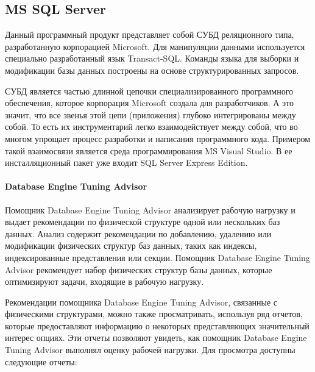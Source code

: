 \subsection{MS SQL Server}

Данный программный продукт представляет собой СУБД реляционного типа, разработанную корпорацией Microsoft. Для манипуляции данными используется специально разработанный язык Transact-SQL. Команды языка для выборки и модификации базы данных построены на основе структурированных запросов.

СУБД является частью длинной цепочки специализированного программного обеспечения, которое корпорация Microsoft создала для разработчиков. А это значит, что все звенья этой цепи (приложения) глубоко интегрированы между собой. То есть их инструментарий легко взаимодействует между собой, что во многом упрощает процесс разработки и написания программного кода. Примером такой взаимосвязи является среда программирования MS Visual Studio. В ее инсталляционный пакет уже входит SQL Server Express Edition. \cite{internet-technologies.ru:SQL-Server}


\paragraph{Database Engine Tuning Advisor}

Помощник Database Engine Tuning Advisor анализирует рабочую нагрузку и выдает рекомендации по физической структуре одной или нескольких баз данных. Анализ содержит рекомендации по добавлению, удалению или модификации физических структур баз данных, таких как индексы, индексированные представления или секции. Помощник Database Engine Tuning Advisor рекомендует набор физических структур базы данных, которые оптимизируют задачи, входящие в рабочую нагрузку.

Рекомендации помощника Database Engine Tuning Advisor, связанные с физическими структурами, можно также просматривать, используя ряд отчетов, которые предоставляют информацию о некоторых представляющих значительный интерес опциях. Эти отчеты позволяют увидеть, как помощник Database Engine Tuning Advisor выполнял оценку рабочей нагрузки. Для просмотра доступны следующие отчеты:

